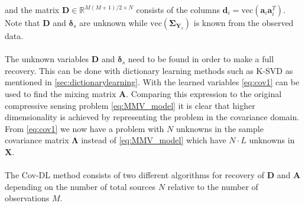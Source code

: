 and the matrix $\mathbf{D} \in \mathbb{R}^{M(M+1)/2 \times N}$ consists of the columns $\mathbf{d}_i = \text{vec}(\mathbf{a}_i \mathbf{a}_i^T)$. Note that $\mathbf{D}$ and $\boldsymbol{\delta}_s$ are unknown while $\text{vec}(\boldsymbol{\Sigma}_{\mathbf{Y}_s})$ is known from the observed data.
\\ \\
The unknown variables $\mathbf{D}$ and $\boldsymbol{\delta}_s$ need to be found in order to make a full recovery. This can be done with dictionary learning methods such as K-SVD as mentioned in \ref{sec:dictionarylearning}. With the learned variables \eqref{eq:cov1} can be used to find the mixing matrix $\mathbf{A}$. Comparing this expression to the original compressive sensing problem \eqref{eq:MMV_model} it is clear that higher dimensionality is achieved by representing the problem in the covariance domain. 
\\
From \eqref{eq:cov1} we now have a problem with $N$ unknowns in the sample covariance matrix $\boldsymbol{\Lambda}$ instead of \eqref{eq:MMV_model} which have $N \cdot L$ unknowns in $\mathbf{X}$.
\\ \\
The Cov-DL method consists of two different algorithms for  recovery of $\mathbf{D}$ and $\mathbf{A}$ depending on the number of total sources $N$ relative to the number of observations $M$. 

